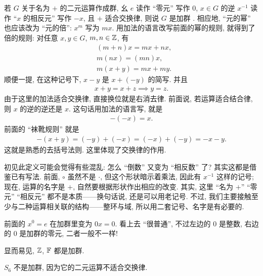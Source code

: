 \begin{definition}
    若 $G$ 关于名为 $+$ 的二元运算作成群, 幺 $e$ 读作 ``零元'' 写作 $0$, $x \in G$ 的逆 $x^{-1}$ 读作 ``$x$ 的相反元'' 写作 $-x$, 且 $+$ 适合交换律, 则说 $G$ 是加群 . 相应地, ``元的幂'' 也应该改为 ``元的倍'': $x^m$ 写为 $mx$. 用加法的语言改写前面的幂的规则, 就得到了倍的规则: 对任意 $x,y \in G$, $m,n \in \mathbb{Z}$, 有
    \begin{align*}
         & (m+n)x = mx + nx, \\
         & m(nx) = (mn)x,    \\
         & m(x+y) = mx + my.
    \end{align*}
    顺便一提, 在这种记号下, $x-y$ 是 $x+(-y)$ 的简写. 并且
    \begin{align*}
        x + y = x + z \implies y = z.
    \end{align*}
    由于这里的加法适合交换律, 直接换位就是右消去律. 前面说, 若运算适合结合律, 则 $x$ 的逆的逆还是 $x$. 这句话用加法的语言写, 就是
    \begin{align*}
        -(-x) = x.
    \end{align*}
    前面的 ``袜靴规则'' 就是
    \begin{align*}
        -(x+y) = (-y) + (-x) = (-x) + (-y) = -x-y.
    \end{align*}
    这就是熟悉的去括号法则. 这里体现了交换律的作用.
\end{definition}

\begin{remark}
    初见此定义可能会觉得有些混乱: 怎么 ``倒数'' 又变为 ``相反数'' 了? 其实这都是借鉴已有写法. 前面, $\circ$ 虽然不是 $\cdot$, 但这个形状暗示着乘法, 因此有 $x^{-1}$ 这样的记号; 现在, 运算的名字是 $+$, 自然要根据形状作出相应的改变. 其实, 这里 ``名为 $+$'' ``零元'' ``相反元'' 都不是本质——换句话说, 还是可以用老记号. 不过, 我们主要接触至少与二种运算相关联的结构——整环与域, 所以用二套记号、名字是有必要的.
\end{remark}

\begin{remark}
    前面的 $x^0 = e$ 在加群里变为 $0x = 0$. 看上去 ``很普通'', 不过左边的 $0$ 是整数, 右边的 $0$ 是加群的零元, 二者一般不一样!
\end{remark}

\begin{example}
    显而易见, $\mathbb{Z}$, $\mathbb{F}$ 都是加群.
\end{example}

\begin{example}
    $S_6$ 不是加群, 因为它的二元运算不适合交换律.
\end{example}

